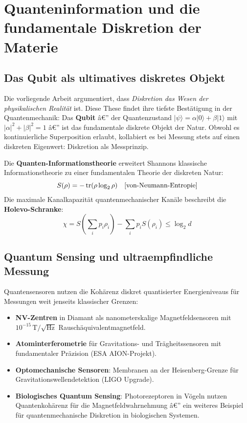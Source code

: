 ﻿\documentclass[12pt,a4paper,titlepage]{report}
\begin{document}
\section{Quanteninformation und die fundamentale Diskretion der Materie}

\subsection{Das Qubit als ultimatives diskretes Objekt}

Die vorliegende Arbeit argumentiert, dass \emph{Diskretion das Wesen der physikalischen
Realität} ist. Diese These findet ihre tiefste Bestätigung in der Quantenmechanik:
Das \textbf{Qubit} â€” der Quantenzustand $|\psi\rangle = \alpha|0\rangle + \beta|1\rangle$
mit $|\alpha|^2 + |\beta|^2 = 1$ â€” ist das fundamentale diskrete Objekt der Natur.
Obwohl es kontinuierliche Superposition erlaubt, kollabiert es bei Messung stets
auf einen diskreten Eigenwert: Diskretion als Messprinzip.

Die \textbf{Quanten-Informationstheorie} erweitert Shannons klassische Informationstheorie
zu einer fundamentalen Theorie der diskreten Natur:
\[
    S(\rho) = -\tr(\rho \log_2 \rho) \quad \text{[von-Neumann-Entropie]}
\]
Die maximale Kanalkapazität quantenmechanischer Kanäle beschreibt die
\textbf{Holevo-Schran\-ke}:
\[
    \chi = S\!\left(\sum_i p_i \rho_i\right) - \sum_i p_i S(\rho_i) \leq \log_2 d
\]

\subsection{Quantum Sensing und ultraempfindliche Messung}

Quantensensoren nutzen die Kohärenz diskret quantisierter Energieniveaus für
Messungen weit jenseits klassischer Grenzen:
\begin{itemize}[leftmargin=2em]
    \item \textbf{NV-Zentren} in Diamant als nanometerskalige Magnetfeldsensoren
        mit $10^{-15}\,\mathrm{T}/\!\sqrt{\mathrm{Hz}}$ Rauschäquivalentmagnetfeld.
    \item \textbf{Atominterferometrie} für Gravitations- und Trägheitssensoren
        mit fundamentaler Präzision (ESA AION-Projekt).
    \item \textbf{Optomechanische Sensoren}: Membranen an der Heisenberg-Grenze
        für Gravitationswellendetektion (LIGO Upgrade).
    \item \textbf{Biologisches Quantum Sensing}: Photorezeptoren in Vögeln
        nutzen Quantenkohärenz für die Magnetfeldwahrnehmung â€” ein weiteres
        Beispiel für quantenmechanische Diskretion in biologischen Systemen.
\end{itemize}
\end{document}
